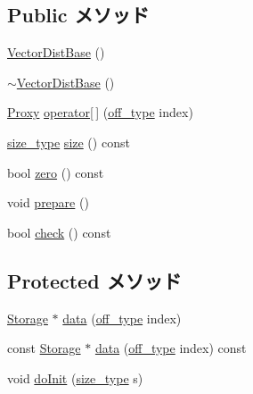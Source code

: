 \subsection*{Public メソッド}
\begin{DoxyCompactItemize}
\item 
\hyperlink{classStats_1_1VectorDistBase_a316aa069cefd2a3279fa3ec781118789}{VectorDistBase} ()
\item 
\hyperlink{classStats_1_1VectorDistBase_a5d5ee07108609e85445723915632d161}{$\sim$VectorDistBase} ()
\item 
\hyperlink{classStats_1_1DistProxy}{Proxy} \hyperlink{classStats_1_1VectorDistBase_ad22583203a39f3bb11549cc89ba71e9d}{operator\mbox{[}$\,$\mbox{]}} (\hyperlink{namespaceStats_a2773c9fa9e4b0b04a46b37494b44842a}{off\_\-type} index)
\item 
\hyperlink{namespaceStats_ada51e68d31936547d3729c82daf6b7c6}{size\_\-type} \hyperlink{classStats_1_1VectorDistBase_a503ab01f6c0142145d3434f6924714e7}{size} () const 
\item 
bool \hyperlink{classStats_1_1VectorDistBase_a4e72b01b727d3165e75cba84eb507491}{zero} () const 
\item 
void \hyperlink{classStats_1_1VectorDistBase_a1825b40ca3bc3a1ba67fdb58fac5015c}{prepare} ()
\item 
bool \hyperlink{classStats_1_1VectorDistBase_a6ecddb2c44556b7acbc1723a968ff8bb}{check} () const 
\end{DoxyCompactItemize}
\subsection*{Protected メソッド}
\begin{DoxyCompactItemize}
\item 
\hyperlink{classStats_1_1VectorDistBase_a5d4a6db0e7c32292f54a08d05c671bd1}{Storage} $\ast$ \hyperlink{classStats_1_1VectorDistBase_ad9077db0c8f34051d2e7766c947aa7b2}{data} (\hyperlink{namespaceStats_a2773c9fa9e4b0b04a46b37494b44842a}{off\_\-type} index)
\item 
const \hyperlink{classStats_1_1VectorDistBase_a5d4a6db0e7c32292f54a08d05c671bd1}{Storage} $\ast$ \hyperlink{classStats_1_1VectorDistBase_a53a38df6a99d518a4016d9635235cc44}{data} (\hyperlink{namespaceStats_a2773c9fa9e4b0b04a46b37494b44842a}{off\_\-type} index) const 
\item 
void \hyperlink{classStats_1_1VectorDistBase_a66947ebf8d14cd3e1f7bfc4c5b4227f4}{doInit} (\hyperlink{namespaceStats_ada51e68d31936547d3729c82daf6b7c6}{size\_\-type} s)
\end{DoxyCompactItemize}

